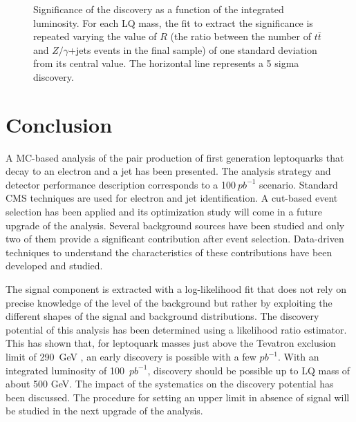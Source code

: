 \documentclass{cmspaper}
\begin{document}
\begin{linenumbers}
 \begin{figure}
   \begin{center}
     \caption{Significance of the discovery as a function of the integrated luminosity.
       For each LQ mass, the fit to extract the significance is repeated varying the value of $R$
       (the ratio between the number of $t\bar{t}$ and $Z/\gamma$+jets events in the final sample)
       of one standard deviation from its central value. 
       The horizontal line represents a 5 sigma discovery.}
     \label{fig:sign_vs_Lint_sysR}
   \end{center}
 \end{figure}


\section{Conclusion}

A MC-based analysis of the pair production of first generation leptoquarks that decay to
an electron and a jet has been presented.
The analysis strategy and detector performance description corresponds to a 100$~pb^{-1}$ scenario.
Standard CMS techniques are used for electron and jet identification. 
A cut-based event selection has been applied and its optimization study will come in a future upgrade
of the analysis.
Several background sources have been studied and only two of them provide a significant contribution
after event selection. 
Data-driven techniques to understand the characteristics of these contributions have been developed 
and studied.

The signal component is extracted with a log-likelihood fit that does not rely on precise knowledge
of the level of the background but rather by exploiting the different shapes of the signal and background
distributions. 
The discovery potential of this analysis has been determined using a likelihood 
ratio estimator. This has shown that, for leptoquark masses just above the Tevatron exclusion limit of 290~GeV
\cite{d02008}, an early discovery is possible with a few $pb^{-1}$.
With an integrated luminosity of 100~$pb^{-1}$, discovery should be possible up
to LQ mass of about 500 GeV.
The impact of the systematics on the discovery potential has been discussed.
The procedure for setting an upper limit in absence of signal will be studied 
in the next upgrade of the analysis.




\end{linenumbers}
\end{document}
